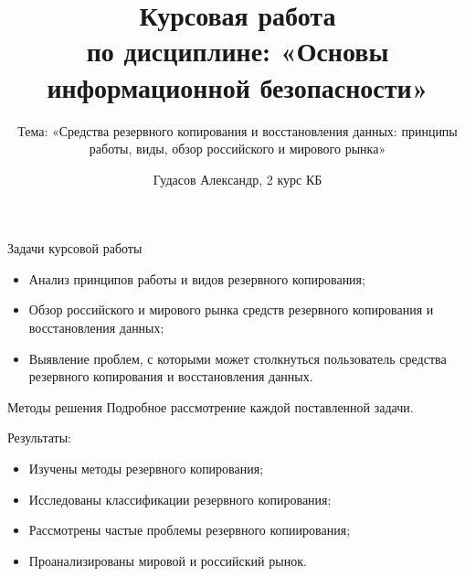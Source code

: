 \documentclass[11pt]{beamer}
\title{Курсовая работа
\\
{\small по дисциплине: «Основы информационной безопасности»}}
\subtitle{Тема: «Средства резервного копирования и восстановления данных: принципы работы, виды, обзор российского и мирового рынка»}
\author{Гудасов Александр, 2 курс КБ}
\institute{Балтийский федеральный университет имени Иммануила Канта}
\begin{document}
	
	\begin{frame}
		\titlepage
	\end{frame}
		\begin{frame}
		\begin{block}{Задачи курсовой работы}
			\begin{itemize}
				\item Анализ принципов работы и видов резервного копирования;
				\item Обзор российского и мирового рынка средств резервного копирования и восстановления данных;
				\item Выявление проблем, с которыми может столкнуться пользователь средства резервного копирования и восстановления данных. 
				\end{itemize}
		\end{block}
		\begin{block}{Методы решения}
				Подробное рассмотрение каждой поставленной задачи.
						\end{block}
	\end{frame}
	\begin{frame}
Результаты:
		\begin{itemize}	
				\item Изучены методы резервного копирования;
				\item Исследованы классификации резервного копирования;
				\item Рассмотрены частые проблемы резервного копиирования;
				\item Проанализированы мировой и российский рынок.
			\end{itemize} 

\end{frame}	
\end{document}
